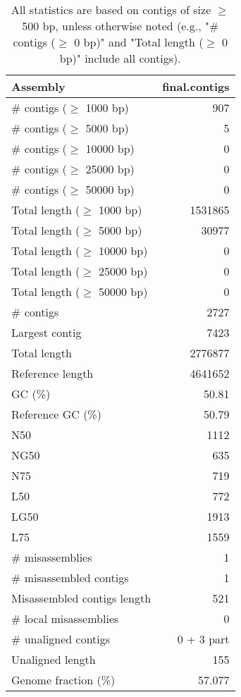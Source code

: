 \documentclass[12pt,a4paper]{article}
\begin{document}
\begin{table}[ht]
\begin{center}
\caption{All statistics are based on contigs of size $\geq$ 500 bp, unless otherwise noted (e.g., "\# contigs ($\geq$ 0 bp)" and "Total length ($\geq$ 0 bp)" include all contigs).}
\begin{tabular}{|l*{1}{|r}|}
\hline
Assembly & final.contigs \\ \hline
\# contigs ($\geq$ 1000 bp) & 907 \\ \hline
\# contigs ($\geq$ 5000 bp) & 5 \\ \hline
\# contigs ($\geq$ 10000 bp) & 0 \\ \hline
\# contigs ($\geq$ 25000 bp) & 0 \\ \hline
\# contigs ($\geq$ 50000 bp) & 0 \\ \hline
Total length ($\geq$ 1000 bp) & 1531865 \\ \hline
Total length ($\geq$ 5000 bp) & 30977 \\ \hline
Total length ($\geq$ 10000 bp) & 0 \\ \hline
Total length ($\geq$ 25000 bp) & 0 \\ \hline
Total length ($\geq$ 50000 bp) & 0 \\ \hline
\# contigs & 2727 \\ \hline
Largest contig & 7423 \\ \hline
Total length & 2776877 \\ \hline
Reference length & 4641652 \\ \hline
GC (\%) & 50.81 \\ \hline
Reference GC (\%) & 50.79 \\ \hline
N50 & 1112 \\ \hline
NG50 & 635 \\ \hline
N75 & 719 \\ \hline
L50 & 772 \\ \hline
LG50 & 1913 \\ \hline
L75 & 1559 \\ \hline
\# misassemblies & 1 \\ \hline
\# misassembled contigs & 1 \\ \hline
Misassembled contigs length & 521 \\ \hline
\# local misassemblies & 0 \\ \hline
\# unaligned contigs & 0 + 3 part \\ \hline
Unaligned length & 155 \\ \hline
Genome fraction (\%) & 57.077 \\ \hline

\end{tabular}
\end{center}
\end{table}
\end{document}
